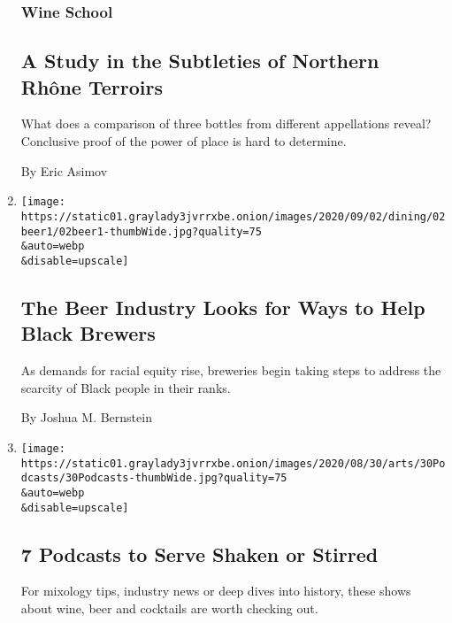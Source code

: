 \begin{enumerate}
  \hypertarget{wine-school-3}{%
  \subsubsection{Wine School}\label{wine-school-3}}

  \hypertarget{a-study-in-the-subtleties-of-northern-rhuxf4ne-terroirs}{%
  \subsection{A Study in the Subtleties of Northern Rhône
  Terroirs}\label{a-study-in-the-subtleties-of-northern-rhuxf4ne-terroirs}}

  What does a comparison of three bottles from different appellations
  reveal? Conclusive proof of the power of place is hard to determine.

  By Eric Asimov
\item
  \href{/2020/08/28/dining/drinks/black-owned-breweries.html}{}

  \texttt{[image: https://static01.graylady3jvrrxbe.onion/images/2020/09/02/dining/02beer1/02beer1-thumbWide.jpg?quality=75\\\&auto=webp\\\&disable=upscale]}

  \hypertarget{the-beer-industry-looks-for-ways-to-help-black-brewers}{%
  \subsection{The Beer Industry Looks for Ways to Help Black
  Brewers}\label{the-beer-industry-looks-for-ways-to-help-black-brewers}}

  As demands for racial equity rise, breweries begin taking steps to
  address the scarcity of Black people in their ranks.

  By Joshua M. Bernstein
\item
  \href{/2020/08/26/arts/wine-beer-cocktail-podcasts.html}{}

  \texttt{[image: https://static01.graylady3jvrrxbe.onion/images/2020/08/30/arts/30Podcasts/30Podcasts-thumbWide.jpg?quality=75\\\&auto=webp\\\&disable=upscale]}

  \hypertarget{7-podcasts-to-serve-shaken-or-stirred}{%
  \subsection{7 Podcasts to Serve Shaken or
  Stirred}\label{7-podcasts-to-serve-shaken-or-stirred}}

  For mixology tips, industry news or deep dives into history, these
  shows about wine, beer and cocktails are worth checking out.


\end{enumerate}
